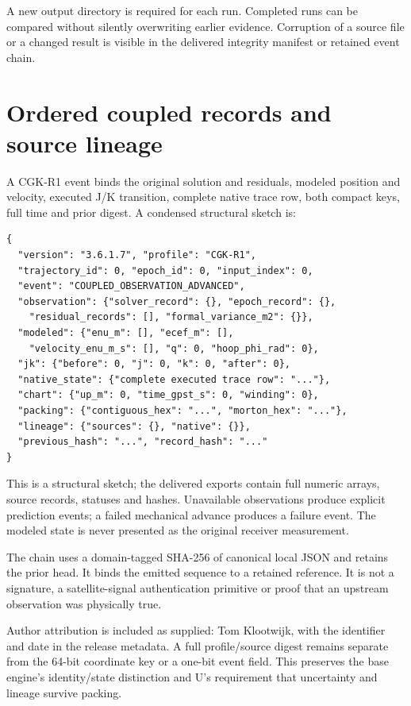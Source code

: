 A new output directory is required for each run. Completed runs can be compared
without silently overwriting earlier evidence. Corruption of a source file or a
changed result is visible in the delivered integrity manifest or retained event chain.
\clearpage

\section{Ordered coupled records and source lineage}
A CGK-R1 event binds the original solution and residuals, modeled position and
velocity, executed J/K transition, complete native trace row, both compact keys,
full time and prior digest. A condensed structural sketch is:

\begin{lstlisting}
{
  "version": "3.6.1.7", "profile": "CGK-R1",
  "trajectory_id": 0, "epoch_id": 0, "input_index": 0,
  "event": "COUPLED_OBSERVATION_ADVANCED",
  "observation": {"solver_record": {}, "epoch_record": {},
    "residual_records": [], "formal_variance_m2": {}},
  "modeled": {"enu_m": [], "ecef_m": [],
    "velocity_enu_m_s": [], "q": 0, "hoop_phi_rad": 0},
  "jk": {"before": 0, "j": 0, "k": 0, "after": 0},
  "native_state": {"complete executed trace row": "..."},
  "chart": {"up_m": 0, "time_gpst_s": 0, "winding": 0},
  "packing": {"contiguous_hex": "...", "morton_hex": "..."},
  "lineage": {"sources": {}, "native": {}},
  "previous_hash": "...", "record_hash": "..."
}
\end{lstlisting}
This is a structural sketch; the delivered exports contain full numeric arrays,
source records, statuses and hashes. Unavailable observations produce explicit
prediction events; a failed mechanical advance produces a failure event. The
modeled state is never presented as the original receiver measurement.

The chain uses a domain-tagged SHA-256 of canonical local JSON and retains the prior
head. It binds the emitted sequence to a retained reference. It is not a signature,
a satellite-signal authentication primitive or proof that an upstream observation
was physically true.

Author attribution is included as supplied: Tom Klootwijk, with the identifier and
date in the release metadata. A full profile/source digest remains separate from the
64-bit coordinate key or a one-bit event field. This preserves the base engine's
identity/state distinction and U's requirement that uncertainty and lineage survive
packing. \base\ 
\clearpage

